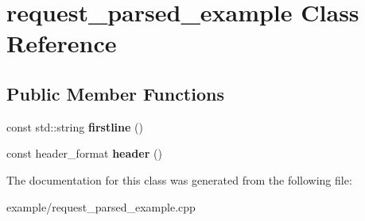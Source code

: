 \hypertarget{classrequest__parsed__example}{}\section{request\+\_\+parsed\+\_\+example Class Reference}
\label{classrequest__parsed__example}
\subsection*{Public Member Functions}
\begin{DoxyCompactItemize}
\item 
\hypertarget{classrequest__parsed__example_a941ea160a3b98f42d7662f9ebf494016}{}const std\+::string {\bfseries firstline} ()\label{classrequest__parsed__example_a941ea160a3b98f42d7662f9ebf494016}

\item 
\hypertarget{classrequest__parsed__example_ac1d93f53e3780cad452917dbd8597d25}{}const header\+\_\+format {\bfseries header} ()\label{classrequest__parsed__example_ac1d93f53e3780cad452917dbd8597d25}

\end{DoxyCompactItemize}


The documentation for this class was generated from the following file\+:\begin{DoxyCompactItemize}
\item 
example/request\+\_\+parsed\+\_\+example.\+cpp\end{DoxyCompactItemize}
